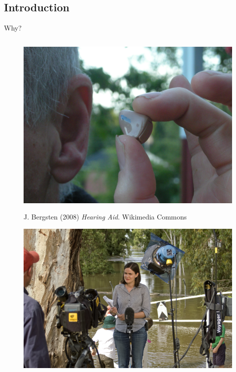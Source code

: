 \subsection{Introduction}
{\nologo
\begin{frame}{Why?}
	\begin{columns}[c]
	\begin{column}{0.55\textwidth}
		\only<1> {
			\begin{figure}
			\centering
			{\centering
			\includegraphics[width=\textwidth,height=0.7\textheight,keepaspectratio]{fig/Hearing_aid_20080620.jpg}
			}
			\caption{J. Bergsten (2008) \textit{Hearing Aid}. Wikimedia Commons}
			\end{figure}
		}
		 {
			\begin{figure}
			\centering
			\includegraphics[width=\textwidth,height=0.7\textheight,keepaspectratio]{fig/ABC_News_reporter,_Naomi_Woodley,_waiting_to_do_a_live_report.jpg}

\end{figure}}
\end{column}
\end{columns}
\end{frame}}
